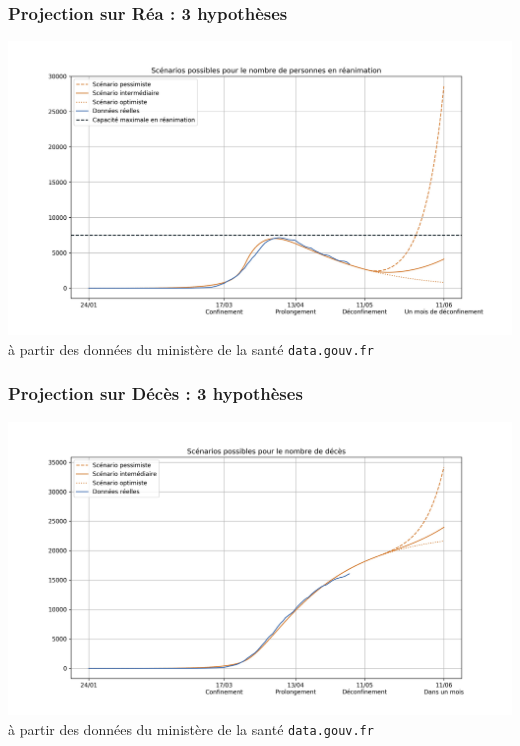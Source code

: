 \documentclass[a4paper]{cours-bdd}
\begin{document}

\begin{frame}[fragile]
\frametitle{Projection sur Réa : 3 hypothèses}

  \begin{center}
    \includegraphics[width=1.0\linewidth]{figure3.jpg} \\
    {\tiny à partir des données du ministère de la santé \texttt{data.gouv.fr}}
  \end{center}
  
\end{frame}


\begin{frame}[fragile]
\frametitle{Projection sur Décès : 3 hypothèses}

  \begin{center}
    \includegraphics[width=1.0\linewidth]{figure4.jpg} \\
    {\tiny à partir des données du ministère de la santé \texttt{data.gouv.fr}}
  \end{center}
  
\end{frame}
\end{document}
